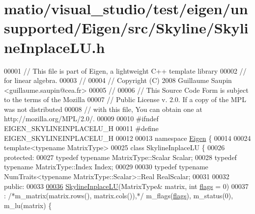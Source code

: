 \hypertarget{matio_2visual__studio_2test_2eigen_2unsupported_2_eigen_2src_2_skyline_2_skyline_inplace_l_u_8h_source}{}\section{matio/visual\+\_\+studio/test/eigen/unsupported/\+Eigen/src/\+Skyline/\+Skyline\+Inplace\+LU.h}
\label{matio_2visual__studio_2test_2eigen_2unsupported_2_eigen_2src_2_skyline_2_skyline_inplace_l_u_8h_source}

\begin{DoxyCode}
00001 \textcolor{comment}{// This file is part of Eigen, a lightweight C++ template library}
00002 \textcolor{comment}{// for linear algebra.}
00003 \textcolor{comment}{//}
00004 \textcolor{comment}{// Copyright (C) 2008 Guillaume Saupin <guillaume.saupin@cea.fr>}
00005 \textcolor{comment}{//}
00006 \textcolor{comment}{// This Source Code Form is subject to the terms of the Mozilla}
00007 \textcolor{comment}{// Public License v. 2.0. If a copy of the MPL was not distributed}
00008 \textcolor{comment}{// with this file, You can obtain one at http://mozilla.org/MPL/2.0/.}
00009 
00010 \textcolor{preprocessor}{#ifndef EIGEN\_SKYLINEINPLACELU\_H}
00011 \textcolor{preprocessor}{#define EIGEN\_SKYLINEINPLACELU\_H}
00012 
00013 \textcolor{keyword}{namespace }\hyperlink{namespace_eigen}{Eigen} \{ 
00014 
00024 \textcolor{keyword}{template}<\textcolor{keyword}{typename} MatrixType>
00025 \textcolor{keyword}{class }SkylineInplaceLU \{
00026 \textcolor{keyword}{protected}:
00027     \textcolor{keyword}{typedef} \textcolor{keyword}{typename} MatrixType::Scalar Scalar;
00028     \textcolor{keyword}{typedef} \textcolor{keyword}{typename} MatrixType::Index Index;
00029     
00030     \textcolor{keyword}{typedef} \textcolor{keyword}{typename} NumTraits<typename MatrixType::Scalar>::Real RealScalar;
00031 
00032 \textcolor{keyword}{public}:
00033 
\hyperlink{class_eigen_1_1_skyline_inplace_l_u_ac76b9384281e73b86b80f770015cf436}{00036}     \hyperlink{class_eigen_1_1_skyline_inplace_l_u_ac76b9384281e73b86b80f770015cf436}{SkylineInplaceLU}(MatrixType& matrix, \textcolor{keywordtype}{int} \hyperlink{class_eigen_1_1_skyline_inplace_l_u_a5e491f7643c548ac81d3f4a7e432be19}{flags} = 0)
00037     : \textcolor{comment}{/*m\_matrix(matrix.rows(), matrix.cols()),*/} m\_flags(\hyperlink{class_eigen_1_1_skyline_inplace_l_u_a5e491f7643c548ac81d3f4a7e432be19}{flags}), m\_status(0), m\_lu(matrix) \{

\end{DoxyCode}
